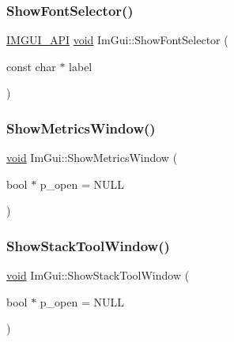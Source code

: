 \subsubsection{\texorpdfstring{Show\+Font\+Selector()}{ShowFontSelector()}}
{\footnotesize\ttfamily \hyperlink{imgui_8h_a43829975e84e45d1149597467a14bbf5}{I\+M\+G\+U\+I\+\_\+\+A\+PI} \hyperlink{imgui__impl__opengl3__loader_8h_ac668e7cffd9e2e9cfee428b9b2f34fa7}{void} Im\+Gui\+::\+Show\+Font\+Selector (\begin{DoxyParamCaption}\item[{const char $\ast$}]{label }\end{DoxyParamCaption})}

\mbox{\label{namespaceImGui_afe7a28c6eb52fff3cc27d5a698fea4ff}} 
\subsubsection{\texorpdfstring{Show\+Metrics\+Window()}{ShowMetricsWindow()}}
{\footnotesize\ttfamily \hyperlink{imgui__impl__opengl3__loader_8h_ac668e7cffd9e2e9cfee428b9b2f34fa7}{void} Im\+Gui\+::\+Show\+Metrics\+Window (\begin{DoxyParamCaption}\item[{bool $\ast$}]{p\+\_\+open = {\ttfamily NULL} }\end{DoxyParamCaption})}

\mbox{\label{namespaceImGui_a5866840f58a4cc09a4fd5f1929a368e5}} 
\subsubsection{\texorpdfstring{Show\+Stack\+Tool\+Window()}{ShowStackToolWindow()}}
{\footnotesize\ttfamily \hyperlink{imgui__impl__opengl3__loader_8h_ac668e7cffd9e2e9cfee428b9b2f34fa7}{void} Im\+Gui\+::\+Show\+Stack\+Tool\+Window (\begin{DoxyParamCaption}\item[{bool $\ast$}]{p\+\_\+open = {\ttfamily NULL} }\end{DoxyParamCaption})}

\mbox{\label{namespaceImGui_a833bb48ec0108ce5c407c211fdb40275}} 
